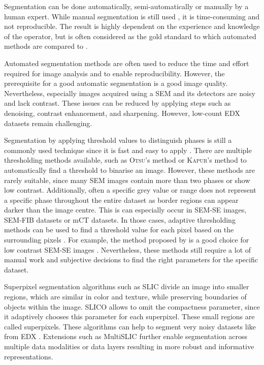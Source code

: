 Segmentation can be done automatically, semi-automatically or manually by a human expert.
While manual segmentation is still used \cite{bajcsy.2020,kleiner.2024a}, it is time-consuming and not reproducible.
The result is highly dependent on the experience and knowledge of the operator, but is often considered as the gold standard to which automated methods are compared to \cite{bajcsy.2020}.

Automated segmentation methods are often used to reduce the time and effort required for image analysis and to enable reproducibility.
However, the prerequisite for a good automatic segmentation is a good image quality.
Nevertheless, especially images acquired using a \ac{SEM} and its detectors are noisy and lack contrast.
These issues can be reduced by applying steps such as denoising, contrast enhancement, and sharpening.
However, low-count \ac{EDX} datasets remain challenging.

Segmentation by applying threshold values to distinguish phases is still a commonly used technique since it is fast and easy to apply \cite{hlobil.2022}.
There are multiple thresholding methods available, such as \textsc{Otsu}'s method \cite{otsu.1979} or \textsc{Kapur}'s method \cite{kapur.1985} to automatically find a threshold to binarise an image.
However, these methods are rarely suitable, since many \ac{SEM} images contain more than two phases or show low contrast.
Additionally, often a specific grey value or range does not represent a specific phase throughout the entire dataset as border regions can appear darker than the image centre.
This is can especially occur in \ac{SEM}-\ac{SE} images, \ac{SEM}-\ac{FIB} datasets or \ac{mCT} datasets.
In those cases, adaptive thresholding methods can be used to find a threshold value for each pixel based on the surrounding pixels \cite{sauvola.2000, phansalkar.2011}.
For example, the method proposed by \textcite{phansalkar.2011} is a good choice for low contrast \ac{SEM}-\ac{SE} images \cite{kleiner.2021a}.
Nevertheless, these methods still require a lot of manual work and subjective decisions to find the right parameters for the specific dataset.

Superpixel segmentation algorithms such as \ac{SLIC} \cite{achanta.2012} divide an image into smaller regions, which are similar in color and texture, while preserving boundaries of objects within the image.
\ac{SLIC}O allows to omit the compactness parameter, since it adaptively chooses this parameter for each superpixel.
These small regions are called superpixels.
These algorithms can help to segment very noisy datasets like from \ac{EDX} \cite{georget.2021, jiang.2022}.
Extensions such as Multi\ac{SLIC} \cite{yu.2023} further enable segmentation across multiple data modalities or data layers resulting in more robust and informative representations.

